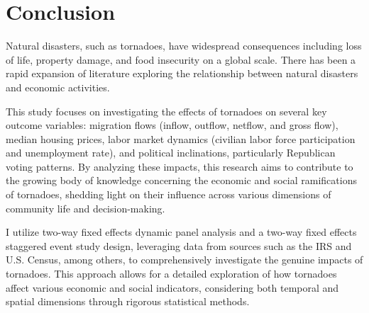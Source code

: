 \documentclass[letterpaper]{article}
\begin{document}
\section{Conclusion}
\label{5}

Natural disasters, such as tornadoes, have widespread consequences including loss of life, property damage, and food insecurity on a global scale. There has been a rapid expansion of literature exploring the relationship between natural disasters and economic activities. 

This study focuses on investigating the effects of tornadoes on several key outcome variables: migration flows (inflow, outflow, netflow, and gross flow), median housing prices, labor market dynamics (civilian labor force participation and unemployment rate), and political inclinations, particularly Republican voting patterns. By analyzing these impacts, this research aims to contribute to the growing body of knowledge concerning the economic and social ramifications of tornadoes, shedding light on their influence across various dimensions of community life and decision-making.

I utilize two-way fixed effects dynamic panel analysis and a two-way fixed effects staggered event study design, leveraging data from sources such as the IRS and U.S. Census, among others, to comprehensively investigate the genuine impacts of tornadoes. This approach allows for a detailed exploration of how tornadoes affect various economic and social indicators, considering both temporal and spatial dimensions through rigorous statistical methods.
\end{document}
